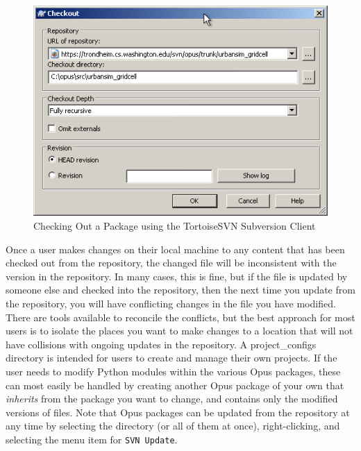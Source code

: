 \begin{figure}[htp]
\begin{center}
\includegraphics[scale=0.4]{graphics/tortoisesvn.png}
\end{center}
\caption{Checking Out a Package using the TortoiseSVN Subversion Client}
\label{fig:tortoisesvn}
\end{figure}

Once a user makes changes on their local machine to any content that has
been checked out from the repository, the changed file will be inconsistent
with the version in the repository.  In many cases, this is fine, but if
the file is updated by someone else and checked into the repository, then
the next time you update from the repository, you will have conflicting
changes in the file you have modified.  There are tools available to
reconcile the conflicts, but the best approach for most users is to isolate
the places you want to make changes to a location that will not have
collisions with ongoing updates in the repository.  A project\_configs
directory is intended for users to create and manage their own projects.
If the user needs to modify Python modules within the various Opus
packages, these can most easily be handled by creating another Opus package
of your own that \emph{inherits} from the package you want to change, and
contains only the modified versions of files.  Note that Opus packages can
be updated from the repository at any time by selecting the directory (or
all of them at once), right-clicking, and selecting the menu item for
\verb#SVN Update#.

